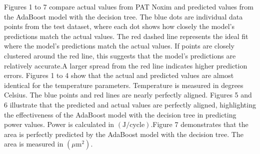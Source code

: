 \documentclass[conference]{IEEEtran}
\begin{document}
	Figures 1 to 7 compare actual values from PAT Noxim and predicted values from the AdaBoost model with the decision tree. The blue dots are individual data points from the test dataset, where each dot shows how closely the model’s predictions match the actual values. The red dashed line represents the ideal fit where the model’s predictions match the actual values. If points are closely clustered around the red line, this suggests that the model’s predictions are relatively accurate.A larger spread from the red line indicates higher prediction errors. Figures 1 to 4 show that the actual and predicted values are almost identical for the temperature parameters. Temperature is measured in degrees Celsius. The blue points and red lines are nearly perfectly aligned. Figures 5 and 6 illustrate that the predicted and actual values are perfectly aligned, highlighting the effectiveness of the AdaBoost model with the decision tree in predicting power values. Power is calculated in \((\text{J/cycle})\).Figure 7 demonstrates that the area is perfectly predicted by the AdaBoost model with the decision tree. The area is measured in \((\mu\text{m}^2)\).
\end{document}
